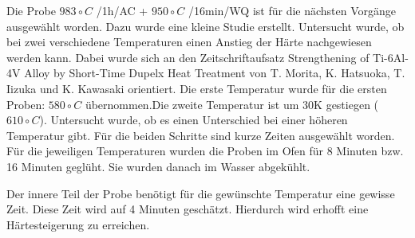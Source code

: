 Die Probe $983\circ C$ /1h/AC + $950\circ C$ /16min/WQ ist für die nächsten Vorgänge ausgewählt worden. Dazu wurde eine kleine Studie erstellt. Untersucht wurde, ob bei zwei verschiedene Temperaturen einen Anstieg der Härte nachgewiesen werden kann. Dabei wurde sich an den Zeitschriftaufsatz Strengthening of Ti-6Al-4V Alloy by Short-Time Dupelx Heat Treatment von T. Morita, K. Hatsuoka, T. Iizuka und K. Kawasaki orientiert. Die erste Temperatur wurde für die ersten Proben: $580\circ C$ übernommen.Die zweite Temperatur ist um 30K gestiegen ($610\circ C$). Untersucht wurde, ob es einen Unterschied bei einer höheren Temperatur gibt. Für die beiden Schritte sind kurze Zeiten ausgewählt worden. Für die jeweiligen Temperaturen wurden die Proben im Ofen für 8 Minuten bzw. 16 Minuten geglüht. Sie wurden danach im Wasser abgekühlt. 

Der innere Teil der Probe benötigt für die gewünschte Temperatur eine gewisse Zeit. Diese Zeit wird auf 4 Minuten geschätzt. Hierdurch wird erhofft eine Härtesteigerung zu erreichen.
